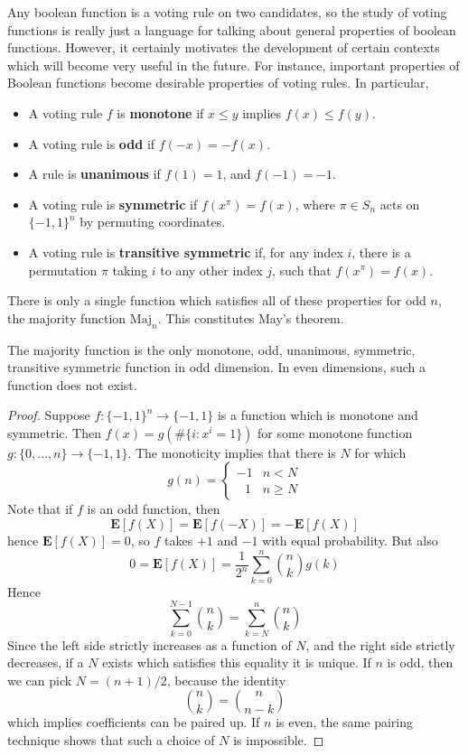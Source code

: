 Any boolean function is a voting rule on two candidates, so the study of voting functions is really just a language for talking about general properties of boolean functions. However, it certainly motivates the development of certain contexts which will become very useful in the future. For instance, important properties of Boolean functions become desirable properties of voting rules. In particular,
%
\begin{itemize}
    \item A voting rule $f$ is {\bf monotone} if $x \leq y$ implies $f(x) \leq f(y)$.
    \item A voting rule is {\bf odd} if $f(-x) = -f(x)$.
    \item A rule is {\bf unanimous} if $f(1) = 1$, and $f(-1) = -1$.
    \item A voting rule is {\bf symmetric} if $f(x^\pi) = f(x)$, where $\pi \in S_n$ acts on $\{ -1, 1 \}^n$ by permuting coordinates.
    \item A voting rule is {\bf transitive symmetric} if, for any index $i$, there is a permutation $\pi$ taking $i$ to any other index $j$, such that $f(x^\pi) = f(x)$.
\end{itemize}
%
There is only a single function which satisfies all of these properties for odd $n$, the majority function $\text{Maj}_n$. This constitutes May's theorem.

\begin{theorem}
    The majority function is the only monotone, odd, unanimous, symmetric, transitive symmetric function in odd dimension. In even dimensions, such a function does not exist.
\end{theorem}
\begin{proof}
    Suppose $f: \{ -1, 1 \}^n \to \{ -1, 1 \}$ is a function which is monotone and symmetric. Then $f(x) = g(\# \{ i : x^i = 1 \})$ for some monotone function $g: \{ 0, \dots, n \} \to \{ -1, 1 \}$. The monoticity implies that there is $N$ for which
    \[ g(n) = \begin{cases} -1 & n < N \\ \ \ \ 1 & n \geq N \end{cases} \]
    Note that if $f$ is an odd function, then
    \[ \mathbf{E}[f(X)] = \mathbf{E}[f(-X)] = - \mathbf{E}[f(X)] \]
    hence $\mathbf{E}[f(X)] = 0$, so $f$ takes $+1$ and $-1$ with equal probability. But also
    \[ 0 = \mathbf{E}[f(X)] = \frac{1}{2^n} \sum_{k = 0}^n {n \choose k} g(k) \]
    Hence
    \[ \sum_{k = 0}^{N-1} {n \choose k} = \sum_{k = N}^n {n \choose k} \]
    Since the left side strictly increases as a function of $N$, and the right side strictly decreases, if a $N$ exists which satisfies this equality it is unique. If $n$ is odd, then we can pick $N = (n+1)/2$, because the identity
    \[ {n \choose k} = {n \choose n-k} \]
    which implies coefficients can be paired up. If $n$ is even, the same pairing technique shows that such a choice of $N$ is impossible.
\end{proof}


